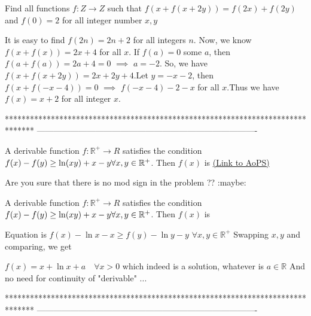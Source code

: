 \begin{solution}
	\begin{tcolorbox}Find all  functions  $f:Z\longrightarrow Z $ such that $f (x+f(x+2y))=f (2x)+f (2y) $ and $f(0)=2$ for all integer number $x,y $\end{tcolorbox}

It is easy to find $f(2n)= 2n+2$ for all integers $n$.
Now, we know $f(x+f(x))=2x+4$ for all $x$.  If $f(a)= 0$ some $a$, then $f(a+f(a))=2a+4=0$ $\implies$ $a=-2$.
So, we have $f (x+f(x+2y))=2x+2y+4 $.Let $y=-x-2$, then
$f(x+f(-x-4))=0$ $\implies$ $f(-x-4)-2-x$ for all $x$.Thus
we have $f(x)=x+2$ for all integer $x$.
\end{solution}
*******************************************************************************
-------------------------------------------------------------------------------

\begin{problem}
	A derivable function $f:\mathbb{R^{+}}\rightarrow R$ satisfies the condition $f(x)-f(y)\geq \ln(x\/y)+x-y\forall x,y\in\mathbb{R^{+}}$. Then $f(x)$ is
	\flushright \href{https://artofproblemsolving.com/community/c6h1628547}{(Link to AoPS)}
\end{problem}



\begin{solution}
	Are you sure that there is no mod sign in the problem ?? :maybe:
\end{solution}



\begin{solution}
	\begin{tcolorbox}A derivable function $f:\mathbb{R^{+}}\rightarrow R$ satisfies the condition $f(x)-f(y)\geq \ln(x\/y)+x-y\forall x,y\in\mathbb{R^{+}}$. Then $f(x)$ is\end{tcolorbox}
Equation is $f(x)-\ln x-x\ge f(y)-\ln y-y$ $\forall x,y\in\mathbb R^+$
Swapping $x,y$ and comparing, we get

$\boxed{f(x)=x+\ln x+a\quad\forall x>0}$ which indeed is a solution, whatever is $a\in\mathbb R$
And no need for continuity of "derivable" ...
\end{solution}
*******************************************************************************
-------------------------------------------------------------------------------

